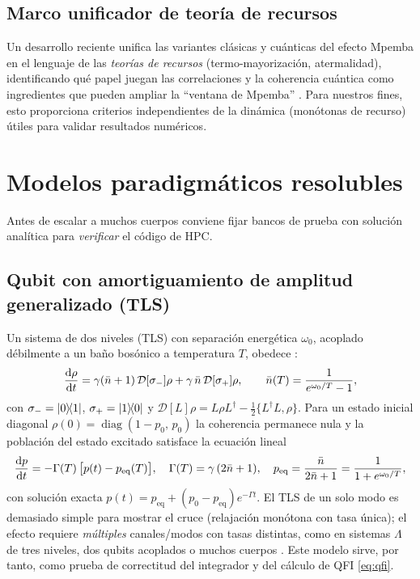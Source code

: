 \documentclass[11pt,a4paper]{article}
\theoremstyle{definition}
\theoremstyle{plain}
\newcommand{\Dop}{\mathcal{D}}
\begin{document}
\subsection{Marco unificador de teoría de recursos}

Un desarrollo reciente unifica las variantes clásicas y cuánticas del efecto Mpemba en el lenguaje de las
\emph{teorías de recursos} (termo-mayorización, atermalidad), identificando qué papel juegan las
correlaciones y la coherencia cuántica como ingredientes que pueden ampliar la ``ventana de Mpemba''
\cite{Alyuruk2025,Summer2026}. Para nuestros fines, esto proporciona criterios independientes de la dinámica
(monótonas de recurso) útiles para validar resultados numéricos.

\section{Modelos paradigmáticos resolubles}

Antes de escalar a muchos cuerpos conviene fijar bancos de prueba con solución analítica para
\emph{verificar} el código de HPC.

\subsection{Qubit con amortiguamiento de amplitud generalizado (TLS)}

Un sistema de dos niveles (TLS) con separación energética $\omega_0$, acoplado débilmente a un baño bosónico
a temperatura $T$, obedece \cite{Chattopadhyay2026,LiYang2026}:
\begin{equation}
\dv{\rho}{t}=\gamma(\bar n+1)\,\Dop[\sigma_-]\rho+\gamma\,\bar n\,\Dop[\sigma_+]\rho,
\qquad
\bar n(T)=\frac{1}{e^{\omega_0/T}-1},
\label{eq:tls}
\end{equation}
con $\sigma_-=\dyad{0}{1}$, $\sigma_+=\dyad{1}{0}$ y $\Dop[L]\rho=L\rho L^{\dagger}-\tfrac12\{L^{\dagger}L,\rho\}$.
Para un estado inicial diagonal $\rho(0)=\operatorname{diag}(1-p_0,\,p_0)$ la coherencia permanece nula y la
población del estado excitado satisface la ecuación lineal
\begin{equation}
\dv{p}{t}=-\Gamma(T)\,\big[p(t)-p_{\mathrm{eq}}(T)\big],\quad
\Gamma(T)=\gamma\,(2\bar n+1),\quad
p_{\mathrm{eq}}=\frac{\bar n}{2\bar n+1}=\frac{1}{1+e^{\omega_0/T}},
\end{equation}
con solución exacta $p(t)=p_{\mathrm{eq}}+(p_0-p_{\mathrm{eq}})e^{-\Gamma t}$. El TLS de un solo modo es
demasiado simple para mostrar el cruce (relajación monótona con tasa única); el efecto requiere
\emph{múltiples} canales/modos con tasas distintas, como en sistemas $\Lambda$ de tres niveles, dos qubits
acoplados o muchos cuerpos \cite{LiYang2026,Chattopadhyay2026}. Este modelo sirve, por tanto, como prueba de
correctitud del integrador y del cálculo de QFI \eqref{eq:qfi}.
\end{document}
